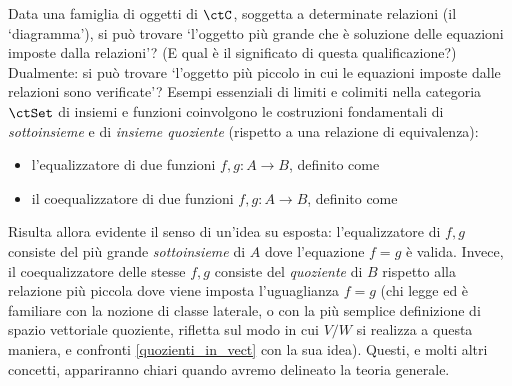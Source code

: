 Data una famiglia di oggetti di \(\ctC\), soggetta a determinate relazioni (il `diagramma'), si può trovare `l'oggetto più grande che è soluzione delle equazioni imposte dalla relazioni'? (E qual è il significato di questa qualificazione?) Dualmente: si può trovare `l'oggetto più piccolo in cui le equazioni imposte dalle relazioni sono verificate'?
\Todo{}
Esempi essenziali di limiti e colimiti nella categoria \(\ctSet\) di insiemi e funzioni coinvolgono le costruzioni fondamentali di \emph{sottoinsieme} e di \emph{insieme quoziente} (rispetto a una relazione di equivalenza):
\begin{itemize}
	\item l'equalizzatore di due funzioni \(f,g : A \to B\), definito come
	      \Todo{}
	\item il coequalizzatore di due funzioni \(f,g : A \to B\), definito come
	      \Todo{}
\end{itemize}
Risulta allora evidente il senso di un'idea su esposta: l'equalizzatore di \(f,g\) consiste del più grande \emph{sottoinsieme} di \(A\) dove l'equazione \(f=g\) è valida. Invece, il coequalizzatore delle stesse \(f,g\) consiste del \emph{quoziente} di \(B\) rispetto alla relazione più piccola dove viene imposta l'uguaglianza \(f=g\) (chi legge ed è familiare con la nozione di classe laterale, o con la più semplice definizione di spazio vettoriale quoziente, rifletta sul modo in cui \(V/W\) si realizza a questa maniera, e confronti \ref{quozienti_in_vect} con la sua idea).
\Todo{}
Questi, e molti altri concetti, appariranno chiari quando avremo delineato la teoria generale.
\Todo{}
